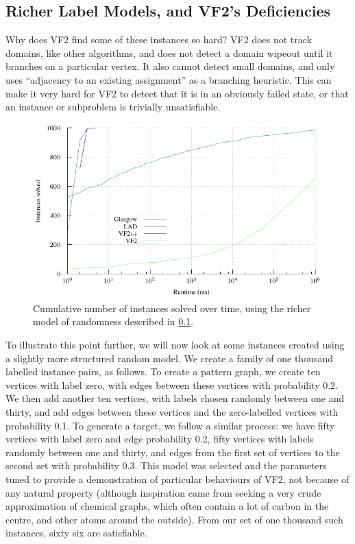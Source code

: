 \documentclass[twoside,11pt]{article}
\begin{document}
\subsection{Richer Label Models, and VF2's Deficiencies}\label{subsection:richer-labels}

Why does VF2 find some of these instances so hard? VF2 does not track domains, like other
algorithms, and does not detect a domain wipeout until it branches on a particular vertex.  It also
cannot detect small domains, and only uses ``adjacency to an existing assignment'' as a branching
heuristic. This can make it very hard for VF2 to detect that it is in an obviously failed state, or
that an instance or subproblem is trivially unsatisfiable.

\begin{figure}[t]
    \centering
    \includegraphics*{plots/skewed.pdf}

    \caption{Cumulative number of instances solved over time, using the richer model of randomness
    described in \cref{subsection:richer-labels}.}
    \label{figure:skewed-cumulative}
\end{figure}

To illustrate this point further, we will now look at some instances created using a slightly more
structured random model. We create a family of one thousand labelled instance pairs, as follows. To
create a pattern graph, we create ten vertices with label zero, with edges between these vertices
with probability 0.2. We then add another ten vertices, with labels chosen randomly between one and
thirty, and add edges between these vertices and the zero-labelled vertices with probability 0.1.
To generate a target, we follow a similar process: we have fifty vertices with label zero and edge
probability 0.2, fifty vertices with labels randomly between one and thirty, and edges from the
first set of vertices to the second set with probability 0.3.  This model was selected and the
parameters tuned to provide a demonstration of particular behaviours of VF2, not because of any natural
property (although inspiration came from seeking a very crude approximation of chemical graphs,
which often contain a lot of carbon in the centre, and other atoms around the outside). From our set
of one thousand such instances, sixty six are satisfiable.
\end{document}
